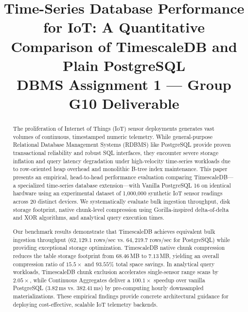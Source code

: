 \documentclass[conference,a4paper]{IEEEtran}
\begin{document}
\title{Time-Series Database Performance for IoT: A Quantitative Comparison of TimescaleDB and Plain PostgreSQL\\
\large DBMS Assignment 1 --- Group G10 Deliverable
}

\author{
}

\maketitle

\begin{abstract}
The proliferation of Internet of Things (IoT) sensor deployments generates vast volumes of continuous, timestamped numeric telemetry. While general-purpose Relational Database Management Systems (RDBMS) like PostgreSQL provide proven transactional reliability and robust SQL interfaces, they encounter severe storage inflation and query latency degradation under high-velocity time-series workloads due to row-oriented heap overhead and monolithic B-tree index maintenance. This paper presents an empirical, head-to-head performance evaluation comparing TimescaleDB---a specialized time-series database extension---with Vanilla PostgreSQL 16 on identical hardware using an experimental dataset of 1,000,000 synthetic IoT sensor readings across 20 distinct devices. We systematically evaluate bulk ingestion throughput, disk storage footprint, native chunk-level compression using Gorilla-inspired delta-of-delta and XOR algorithms, and analytical query execution times. 

Our benchmark results demonstrate that TimescaleDB achieves equivalent bulk ingestion throughput ($62,129.1$ rows/sec vs. $64,219.7$ rows/sec for PostgreSQL) while providing exceptional storage optimization. TimescaleDB native chunk compression reduces the table storage footprint from $68.46$\,MB to $7.13$\,MB, yielding an overall compression ratio of $15.5\times$ and $93.55\%$ total space savings. In analytical query workloads, TimescaleDB chunk exclusion accelerates single-sensor range scans by $2.05\times$, while Continuous Aggregates deliver a $100.1\times$ speedup over vanilla PostgreSQL ($3.82$\,ms vs. $382.41$\,ms) by pre-computing hourly downsampled materializations. These empirical findings provide concrete architectural guidance for deploying cost-effective, scalable IoT telemetry backends.
\end{abstract}
\end{document}
